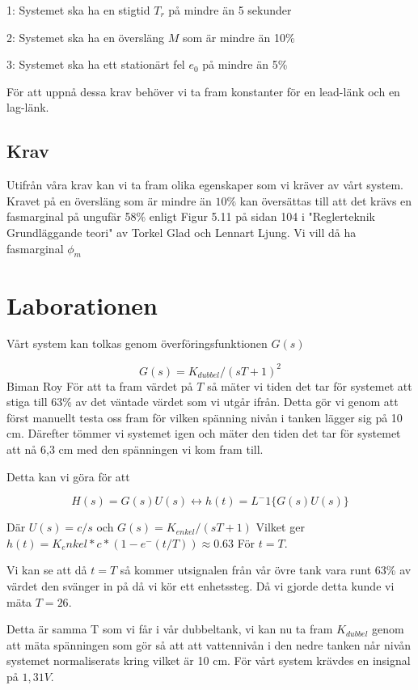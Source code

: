 \documentclass{acm_proc_article-sp}
\begin{document}
1: Systemet ska ha en stigtid $T_r$ på mindre än 5 sekunder

2: Systemet ska ha en översläng $M$ som är mindre än 10\%

3: Systemet ska ha ett stationärt fel $e_0$ på mindre än 5\%

För att uppnå dessa krav behöver vi ta fram konstanter för en lead-länk och en lag-länk.

\subsection{Krav}

Utifrån våra krav kan vi ta fram olika egenskaper som vi kräver av vårt system. Kravet på en översläng som är mindre än $10\%$ kan översättas till att det krävs en fasmarginal på ungufär 58\% enligt  Figur 5.11 på sidan 104 i "Reglerteknik Grundläggande teori" av Torkel Glad och Lennart Ljung. Vi vill då ha fasmarginal $\phi_m$

\section{Laborationen}

Vårt system kan tolkas genom överföringsfunktionen $G(s)$

\begin{equation}
G(s) = K_{dubbel}/(sT +1)^2
\end{equation}
Biman Roy
För att ta fram värdet på $T$ så mäter vi tiden det tar för systemet att stiga till 63\% av det väntade värdet som vi utgår ifrån. Detta gör vi genom att först manuellt testa oss fram för vilken spänning nivån i tanken lägger sig på 10 cm. Därefter tömmer vi systemet igen och mäter den tiden det tar för systemet att nå 6,3 cm med den spänningen vi kom fram till. 

Detta kan vi göra för att

\begin{equation}
H(s) = G(s)U(s) \leftrightarrow h(t) = L^-1\{G(s)U(s)\}
\end{equation}

Där $U(s) = c/s$ och $G(s) = K_{enkel}/(sT + 1)$ Vilket ger $h(t) = K_enkel * c * (1-e^-(t/T)) \approx 0.63$ För $t=T$.

Vi kan se att då $t = T$ så kommer utsignalen från vår övre tank vara runt 63\% av värdet den svänger in på då vi kör ett enhetssteg. Då vi gjorde detta kunde vi mäta $T = 26$.

Detta är samma T som vi får i vår dubbeltank, vi kan nu ta fram $K_{dubbel}$ genom att mäta spänningen som gör så att att vattennivån i den nedre tanken når nivån systemet normaliserats kring vilket är 10 cm. För vårt system krävdes en insignal på $1,31V$.
\end{document}

